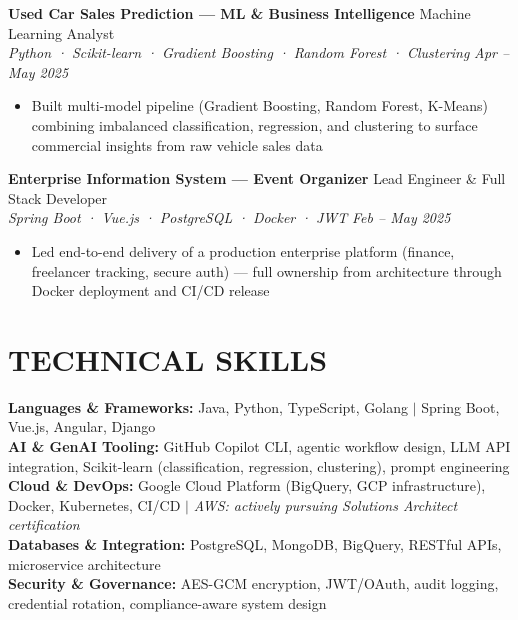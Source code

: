 \documentclass[10pt,a4paper]{article}
\newcommand{\experienceheader}[4]{
    \textbf{#1} \hfill #2 \\
    \textit{#3} \hfill \textit{#4}
}
\begin{document}
\experienceheader{Used Car Sales Prediction --- ML \& Business Intelligence}{Machine Learning Analyst}{Python · Scikit-learn · Gradient Boosting · Random Forest · Clustering}{Apr -- May 2025}
\begin{itemize}[leftmargin=*, itemsep=0.5pt, topsep=0.5pt]
    \item Built multi-model pipeline (Gradient Boosting, Random Forest, K-Means) combining imbalanced classification, regression, and clustering to surface commercial insights from raw vehicle sales data
\end{itemize}

\vspace{1pt}

\experienceheader{Enterprise Information System --- Event Organizer}{Lead Engineer \& Full Stack Developer}{Spring Boot · Vue.js · PostgreSQL · Docker · JWT}{Feb -- May 2025}
\begin{itemize}[leftmargin=*, itemsep=0.5pt, topsep=0.5pt]
    \item Led end-to-end delivery of a production enterprise platform (finance, freelancer tracking, secure auth) --- full ownership from architecture through Docker deployment and CI/CD release
\end{itemize}

\vspace{-5pt}

\section*{TECHNICAL SKILLS}

\textbf{Languages \& Frameworks:} Java, Python, TypeScript, Golang $|$ Spring Boot, Vue.js, Angular, Django \\
\textbf{AI \& GenAI Tooling:} GitHub Copilot CLI, agentic workflow design, LLM API integration, Scikit-learn (classification, regression, clustering), prompt engineering \\
\textbf{Cloud \& DevOps:} Google Cloud Platform (BigQuery, GCP infrastructure), Docker, Kubernetes, CI/CD $|$ \textit{AWS: actively pursuing Solutions Architect certification} \\
\textbf{Databases \& Integration:} PostgreSQL, MongoDB, BigQuery, RESTful APIs, microservice architecture \\
\textbf{Security \& Governance:} AES-GCM encryption, JWT/OAuth, audit logging, credential rotation, compliance-aware system design
\end{document}
